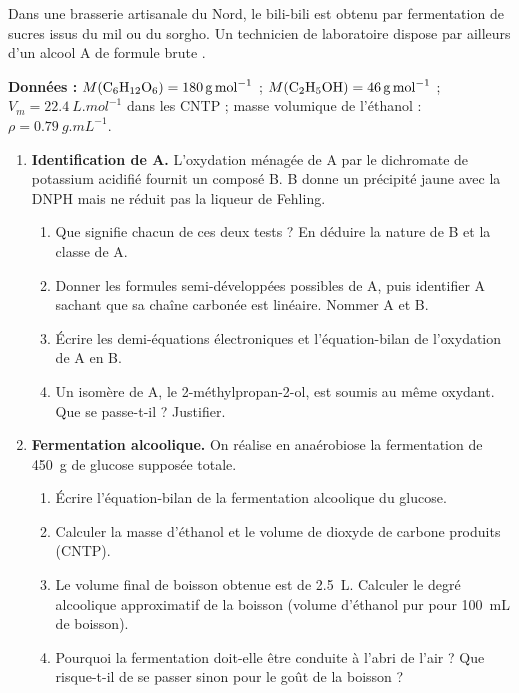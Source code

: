 \documentclass[11pt]{article}
\begin{document}
\begin{exercice}
Dans une brasserie artisanale du Nord, le bili-bili est obtenu par fermentation de sucres issus du mil ou du sorgho. Un technicien de laboratoire dispose par ailleurs d'un alcool A de formule brute .
\par\textbf{Données :} $M(\ce{C6H12O6}) = \SI{180}{g.mol^{-1}}$ ; $M(\ce{C2H5OH}) = \SI{46}{g.mol^{-1}}$ ; $V_m = \SI{22,4}{L.mol^{-1}}$ dans les CNTP ; masse volumique de l'éthanol : $\rho = \SI{0,79}{g.mL^{-1}}$.
\begin{enumerate}
\item \textbf{Identification de A.} L'oxydation ménagée de A par le dichromate de potassium acidifié fournit un composé B. B donne un précipité jaune avec la DNPH mais ne réduit pas la liqueur de Fehling.
\begin{enumerate}
\item Que signifie chacun de ces deux tests ? En déduire la nature de B et la classe de A.
\item Donner les formules semi-développées possibles de A, puis identifier A sachant que sa chaîne carbonée est linéaire. Nommer A et B.
\item Écrire les demi-équations électroniques et l'équation-bilan de l'oxydation de A en B.
\item Un isomère de A, le 2-méthylpropan-2-ol, est soumis au même oxydant. Que se passe-t-il ? Justifier.
\end{enumerate}
\item \textbf{Fermentation alcoolique.} On réalise en anaérobiose la fermentation de \SI{450}{g} de glucose supposée totale.
\begin{enumerate}
\item Écrire l'équation-bilan de la fermentation alcoolique du glucose.
\item Calculer la masse d'éthanol et le volume de dioxyde de carbone produits (CNTP).
\item Le volume final de boisson obtenue est de \SI{2,5}{L}. Calculer le degré alcoolique approximatif de la boisson (volume d'éthanol pur pour \SI{100}{mL} de boisson).
\item Pourquoi la fermentation doit-elle être conduite à l'abri de l'air ? Que risque-t-il de se passer sinon pour le goût de la boisson ?
\end{enumerate}
\end{enumerate}
\end{exercice}
\end{document}

